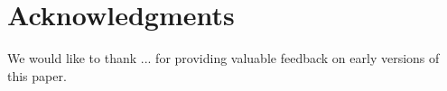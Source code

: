 \section{Acknowledgments} 

We would like to thank ... for providing valuable feedback on early
versions of this paper.
